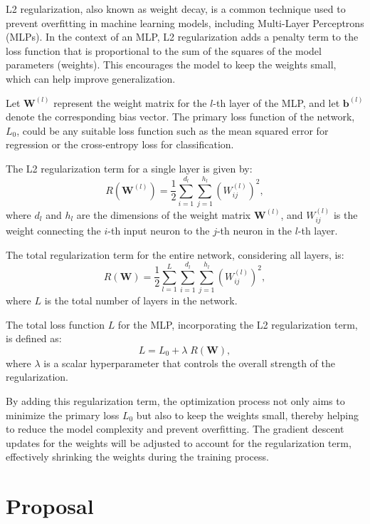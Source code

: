 L2 regularization, also known as weight decay, is a common technique used to prevent overfitting in machine learning models, including Multi-Layer Perceptrons (MLPs). In the context of an MLP, L2 regularization adds a penalty term to the loss function that is proportional to the sum of the squares of the model parameters (weights). This encourages the model to keep the weights small, which can help improve generalization.

Let $\mathbf{W}^{(l)}$ represent the weight matrix for the $l$-th layer of the MLP, and let $\mathbf{b}^{(l)}$ denote the corresponding bias vector. The primary loss function of the network, $L_0$, could be any suitable loss function such as the mean squared error for regression or the cross-entropy loss for classification.

The L2 regularization term for a single layer is given by:
\begin{equation}
R(\mathbf{W}^{(l)}) = \frac{1}{2} \sum_{i=1}^{d_l} \sum_{j=1}^{h_l} \left( W^{(l)}_{ij} \right)^2,
\end{equation}
where $d_l$ and $h_l$ are the dimensions of the weight matrix $\mathbf{W}^{(l)}$, and $W^{(l)}_{ij}$ is the weight connecting the $i$-th input neuron to the $j$-th neuron in the $l$-th layer.

The total regularization term for the entire network, considering all layers, is:
\begin{equation}
R(\mathbf{W}) = \frac{1}{2} \sum_{l=1}^{L} \sum_{i=1}^{d_l} \sum_{j=1}^{h_l} \left( W^{(l)}_{ij} \right)^2,
\end{equation}
where $L$ is the total number of layers in the network.

The total loss function $L$ for the MLP, incorporating the L2 regularization term, is defined as:
\begin{equation}
L = L_0 + \lambda \; R(\mathbf{W}),
\end{equation}
where $\lambda$ is a scalar hyperparameter that controls the overall strength of the regularization.

By adding this regularization term, the optimization process not only aims to minimize the primary loss $L_0$ but also to keep the weights small, thereby helping to reduce the model complexity and prevent overfitting. The gradient descent updates for the weights will be adjusted to account for the regularization term, effectively shrinking the weights during the training process.


\section{Proposal}

